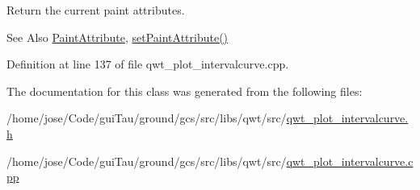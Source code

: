 Return the current paint attributes. 

\begin{DoxySeeAlso}{See Also}
\hyperlink{class_qwt_plot_interval_curve_a3deaf543802d69a38961f9e944bfad95}{Paint\-Attribute}, \hyperlink{class_qwt_plot_interval_curve_ab962c4ad6896bc9d9450f6436f00bd81}{set\-Paint\-Attribute()} 
\end{DoxySeeAlso}


Definition at line 137 of file qwt\-\_\-plot\-\_\-intervalcurve.\-cpp.



The documentation for this class was generated from the following files\-:\begin{DoxyCompactItemize}
\item 
/home/jose/\-Code/gui\-Tau/ground/gcs/src/libs/qwt/src/\hyperlink{qwt__plot__intervalcurve_8h}{qwt\-\_\-plot\-\_\-intervalcurve.\-h}\item 
/home/jose/\-Code/gui\-Tau/ground/gcs/src/libs/qwt/src/\hyperlink{qwt__plot__intervalcurve_8cpp}{qwt\-\_\-plot\-\_\-intervalcurve.\-cpp}\end{DoxyCompactItemize}
